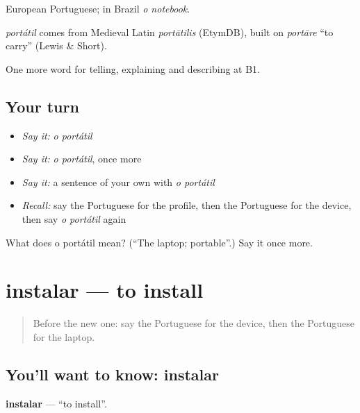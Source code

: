 European Portuguese; in Brazil \emph{o notebook}.

\begin{cousinweb}
\emph{portátil} comes from Medieval Latin \emph{portātilis} (EtymDB), built on \emph{portāre} \textquotedblleft{}to carry\textquotedblright{} (Lewis \& Short).
\end{cousinweb}

\begin{grammarlens}[title={What you've built}]
One more word for telling, explaining and describing at B1.
\end{grammarlens}

\subsection*{Your turn}
\begin{itemize}
\raggedright
  \item \emph{Say it:} \emph{o portátil}
  \item \emph{Say it:} \emph{o portátil}, once more
  \item \emph{Say it:} a sentence of your own with \emph{o portátil}
  \item \emph{Recall:} say the Portuguese for the profile, then the Portuguese for the device, then say \emph{o portátil} again
\end{itemize}

\begin{tcolorbox}[breakable,colback=teal!4,colframe=teal!35!black,title={Before you move on}]
What does o portátil mean? (\textquotedblleft{}The laptop; portable\textquotedblright{}.) Say it once more.
\end{tcolorbox}
\section[instalar]{instalar — to install}

\label{lesson:PT-C397-instalar}



\begin{quote}
Before the new one: say the Portuguese for the device, then the Portuguese for the laptop.
\end{quote}

\subsection*{You'll want to know: instalar}
\textbf{instalar} — \textquotedblleft{}to install\textquotedblright{}.

